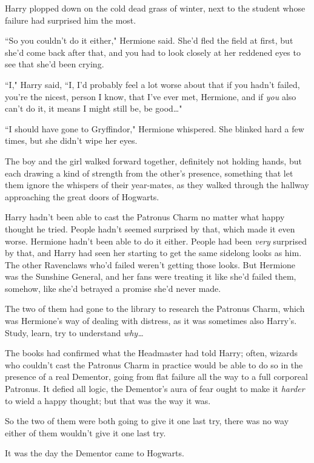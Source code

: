 Harry plopped down on the cold dead grass of winter, next to the student whose failure had surprised him the most.

``So you couldn't do it either," Hermione said. She'd fled the field at first, but she'd come back after that, and you had to look closely at her reddened eyes to see that she'd been crying.

``I," Harry said, ``I, I'd probably feel a lot worse about that if you hadn't failed, you're the nicest, person I know, that I've ever met, Hermione, and if \emph{you} also can't do it, it means I might still be, be good{\ldots}"

``I should have gone to Gryffindor," Hermione whispered. She blinked hard a few times, but she didn't wipe her eyes.

\later

The boy and the girl walked forward together, definitely not holding hands, but each drawing a kind of strength from the other's presence, something that let them ignore the whispers of their year-mates, as they walked through the hallway approaching the great doors of Hogwarts.

Harry hadn't been able to cast the Patronus Charm no matter what happy thought he tried. People hadn't seemed surprised by that, which made it even worse. Hermione hadn't been able to do it either. People had been \emph{very} surprised by that, and Harry had seen her starting to get the same sidelong looks as him. The other Ravenclaws who'd failed weren't getting those looks. But Hermione was the Sunshine General, and her fans were treating it like she'd failed them, somehow, like she'd betrayed a promise she'd never made.

The two of them had gone to the library to research the Patronus Charm, which was Hermione's way of dealing with distress, as it was sometimes also Harry's. Study, learn, try to understand \emph{why{\ldots}}

The books had confirmed what the Headmaster had told Harry; often, wizards who couldn't cast the Patronus Charm in practice would be able to do so in the presence of a real Dementor, going from flat failure all the way to a full corporeal Patronus. It defied all logic, the Dementor's aura of fear ought to make it \emph{harder} to wield a happy thought; but that was the way it was.

So the two of them were both going to give it one last try, there was no way either of them wouldn't give it one last try.

It was the day the Dementor came to Hogwarts.

